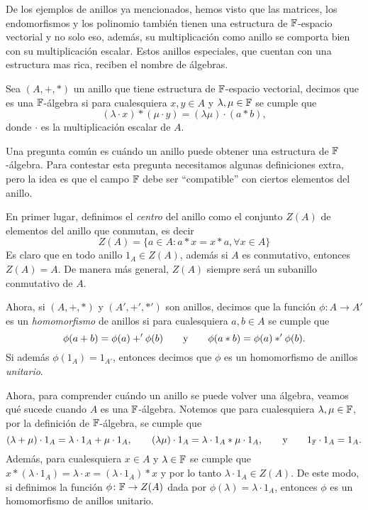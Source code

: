 De los ejemplos de anillos ya mencionados, hemos visto que las matrices, los endomorfismos y los polinomio también tienen una estructura de $\mathbb{F}$-espacio vectorial y no solo eso, además, su multiplicación como anillo se comporta bien con su multiplicación escalar. Estos anillos especiales, que cuentan con una estructura mas rica, reciben el nombre de álgebras.

\begin{defi}
  Sea $(A,+,*)$ un anillo que tiene estructura de $\mathbb{F}$-espacio vectorial, decimos que es una $\mathbb{F}$-álgebra si para cualesquiera $x, y \in A$ y $\lambda, \mu \in \mathbb{F}$ se cumple que
    \[ (\lambda \cdot x) *  (\mu \cdot y) = (\lambda \mu) \cdot (a * b), \]
  donde $\cdot$ es la multiplicación escalar de $A$.
\end{defi}

Una pregunta común es cuándo un anillo puede obtener una estructura de $\mathbb{F}$-álgebra. Para contestar esta pregunta necesitamos algunas definiciones extra, pero la idea es que el campo $\mathbb{F}$ debe ser ``compatible'' con ciertos elementos del anillo.

En primer lugar, definimos el \emph{centro} del anillo como el conjunto $Z(A)$ de elementos del anillo que conmutan, es decir
  \[
    Z(A) = \{a \in A : a*x = x*a, \forall x \in A \}
  \]
Es claro que en todo anillo $1_A \in Z(A)$, además si $A$ es conmutativo, entonces $Z(A) = A$. De manera más general, $Z(A)$ siempre será un subanillo conmutativo de $A$.

Ahora, si $(A, +, *)$ y $(A', +', *')$ son anillos, decimos que la función $\phi\colon A \to A'$ es un \emph{homomorfismo} de anillos si para cualesquiera $a,b \in A$ se cumple que 
\[ \phi(a+b) = \phi(a) +' \phi(b)  \qquad\text{y}\qquad  \phi(a*b) = \phi(a) *' \phi(b). \]
Si además $\phi(1_A) = 1_{A'}$, entonces decimos que $\phi$ es un homomorfismo de anillos \emph{unitario}.

Ahora, para comprender cuándo un anillo se puede volver una álgebra, veamos qué sucede cuando $A$ es una $\mathbb{F}$-álgebra. Notemos que para cualesquiera $\lambda, \mu \in \mathbb{F}$, por la definición de $\mathbb{F}$-álgebra, se cumple que
  \[
    (\lambda +\mu) \cdot 1_A = \lambda \cdot 1_A + \mu \cdot 1_A,
      \qquad 
    (\lambda \mu) \cdot 1_A = \lambda \cdot 1_A * \mu \cdot 1_A,
      \qquad\text{y}\qquad
    1_{\mathbb{F}} \cdot 1_A = 1_A.
  \]
Además, para cualesquiera $x \in A$ y $\lambda \in \mathbb{F}$ se cumple que $x * (\lambda \cdot 1_A) = \lambda \cdot x = (\lambda \cdot 1_A) * x$ y por lo tanto $\lambda \cdot 1_A \in Z(A)$. De este modo, si definimos la función $\phi\colon \mathbb{F}\to Z(A)$ dada por $\phi(\lambda) = \lambda \cdot 1_A$, entonces $\phi$ es un homomorfismo de anillos unitario.

